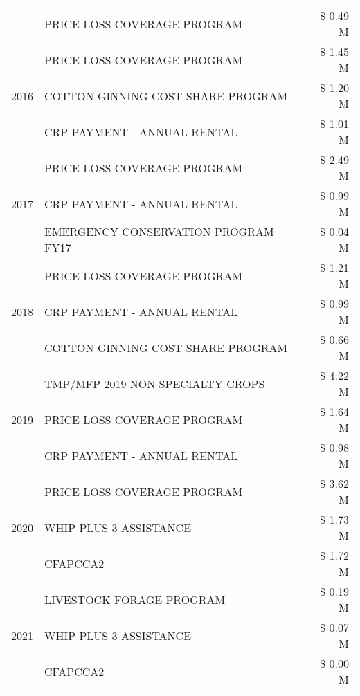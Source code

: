 \begin{tabular}{llr}
 & PRICE LOSS COVERAGE PROGRAM & \$ 0.49 M \\
\cline{1-3}
\multirow[t]{3}{*}{2016} & PRICE LOSS COVERAGE PROGRAM & \$ 1.45 M \\
 & COTTON GINNING COST SHARE PROGRAM & \$ 1.20 M \\
 & CRP PAYMENT - ANNUAL RENTAL & \$ 1.01 M \\
\cline{1-3}
\multirow[t]{3}{*}{2017} & PRICE LOSS COVERAGE PROGRAM & \$ 2.49 M \\
 & CRP PAYMENT - ANNUAL RENTAL & \$ 0.99 M \\
 & EMERGENCY CONSERVATION PROGRAM FY17 & \$ 0.04 M \\
\cline{1-3}
\multirow[t]{3}{*}{2018} & PRICE LOSS COVERAGE PROGRAM & \$ 1.21 M \\
 & CRP PAYMENT - ANNUAL RENTAL & \$ 0.99 M \\
 & COTTON GINNING COST SHARE PROGRAM & \$ 0.66 M \\
\cline{1-3}
\multirow[t]{3}{*}{2019} & TMP/MFP 2019 NON SPECIALTY CROPS & \$ 4.22 M \\
 & PRICE LOSS COVERAGE PROGRAM & \$ 1.64 M \\
 & CRP PAYMENT - ANNUAL RENTAL & \$ 0.98 M \\
\cline{1-3}
\multirow[t]{3}{*}{2020} & PRICE LOSS COVERAGE PROGRAM & \$ 3.62 M \\
 & WHIP PLUS 3 ASSISTANCE & \$ 1.73 M \\
 & CFAPCCA2 & \$ 1.72 M \\
\cline{1-3}
\multirow[t]{3}{*}{2021} & LIVESTOCK FORAGE PROGRAM & \$ 0.19 M \\
 & WHIP PLUS 3 ASSISTANCE & \$ 0.07 M \\
 & CFAPCCA2 & \$ 0.00 M \\
\cline{1-3}
\bottomrule
\end{tabular}
